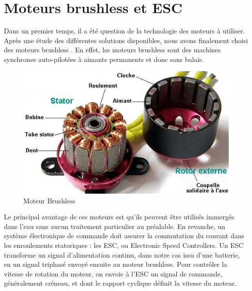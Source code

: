 \documentclass[a4paper,11pt]{report}
\begin{document}
				\section{Moteurs brushless et ESC} 
				
							Dans un premier temps, il a été question de la technologie des moteurs à utiliser. Après une étude des différentes solutions disponibles, nous avons finalement choisi des moteurs brushless \cite{ref5}. En effet, les moteurs brushless sont des machines synchrones auto-pilotées à aimants permanents et donc sans balais.
			\begin{figure}[!h]
				\begin{center}
					\includegraphics{Photos/moteur-brushless}
					\caption{Moteur Brushless}
				\end{center}
			\end{figure}\newline
							Le principal avantage de ces moteurs est qu'ils peuvent être utilisés immergés dans l'eau sans aucun traitement particulier au préalable. En revanche, un système électronique de commande doit assurer la commutation du courant dans les enroulements statoriques : les ESC, ou Electronic Speed Controllers.
			Un ESC transforme un signal d'alimentation continu, dans notre cas issu d'une batterie, en un signal triphasé envoyé ensuite au moteur brushless. Pour contrôler la vitesse de rotation du moteur, on envoie à l'ESC un signal de commande, généralement créneau, et dont le rapport cyclique définit la vitesse du moteur. 
\end{document}
